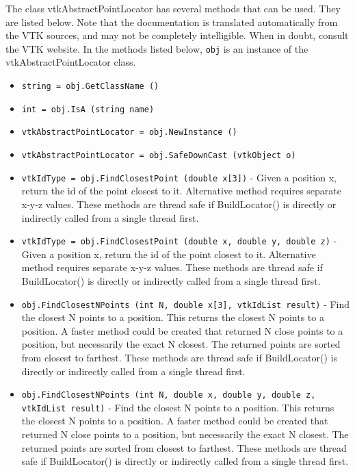 The class vtkAbstractPointLocator has several methods that can be used.
  They are listed below.
Note that the documentation is translated automatically from the VTK sources,
and may not be completely intelligible.  When in doubt, consult the VTK website.
In the methods listed below, \verb|obj| is an instance of the vtkAbstractPointLocator class.
\begin{itemize}
\item  \verb|string = obj.GetClassName ()|

\item  \verb|int = obj.IsA (string name)|

\item  \verb|vtkAbstractPointLocator = obj.NewInstance ()|

\item  \verb|vtkAbstractPointLocator = obj.SafeDownCast (vtkObject o)|

\item  \verb|vtkIdType = obj.FindClosestPoint (double x[3])| -  Given a position x, return the id of the point closest to it. Alternative
 method requires separate x-y-z values.
 These methods are thread safe if BuildLocator() is directly or
 indirectly called from a single thread first.

\item  \verb|vtkIdType = obj.FindClosestPoint (double x, double y, double z)| -  Given a position x, return the id of the point closest to it. Alternative
 method requires separate x-y-z values.
 These methods are thread safe if BuildLocator() is directly or
 indirectly called from a single thread first.

\item  \verb|obj.FindClosestNPoints (int N, double x[3], vtkIdList result)| -  Find the closest N points to a position. This returns the closest
 N points to a position. A faster method could be created that returned
 N close points to a position, but necessarily the exact N closest.
 The returned points are sorted from closest to farthest.
 These methods are thread safe if BuildLocator() is directly or
 indirectly called from a single thread first.

\item  \verb|obj.FindClosestNPoints (int N, double x, double y, double z, vtkIdList result)| -  Find the closest N points to a position. This returns the closest
 N points to a position. A faster method could be created that returned
 N close points to a position, but necessarily the exact N closest.
 The returned points are sorted from closest to farthest.
 These methods are thread safe if BuildLocator() is directly or
 indirectly called from a single thread first.


\end{itemize}
